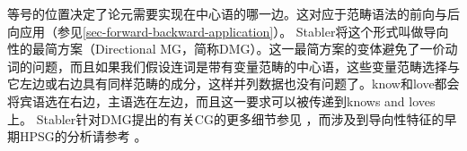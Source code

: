 等号的位置决定了论元需要实现在中心语的哪一边。这对应于范畴语法\indexcg 的前向与后向应用（参见\ref{sec-forward-backward-application}）。
Stabler将这个形式叫做导向性的最简方案（Directional MG，简称DMG）。这一最简方案的变体避免了一价动词的问题，而且如果我们假设连词是带有变量范畴的中心语，这些变量范畴选择与它左边或右边具有同样范畴的成分，这样并列数据也没有问题了。know和love都会将宾语选在右边，主语选在左边，而且这一要求可以被传递到knows and loves上。 Stabler针对DMG提出的有关CG的更多细节参见 ，而涉及到导向性特征的早期HPSG\indexhpsg 的分析请参考 \citet[]{BvN98}。
\nocite{Pollard88a}


